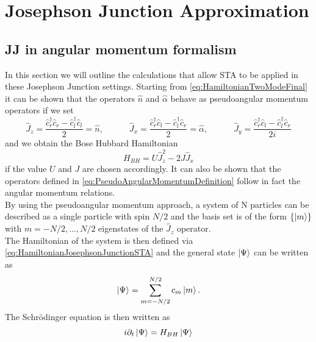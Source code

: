 \documentclass{article}
\begin{document}
\section{Josephson Junction Approximation}

\subsection{JJ in angular momentum formalism}
In this section we will outline the calculations that allow STA to be applied in these Josephson Junction settings.
Starting from \cref{eq:HamiltonianTwoModeFinal} it can be shown that the operators $ \hat{n} $ and $ \hat{ \alpha } $ behave as pseudoangular momentum operators if we set
\begin{equation}
	\label{eq:PseudoAngularMomentumDefinition}
	\hat{J}_z = \frac{\hat{c}_{r}^{\dagger}\hat{c}_{r} - \hat{c}_{l}^{\dagger}\hat{c}_{l}}{2} = \hat{n},\hspace{3em} \hat{J}_x =\frac{\hat{c}_{r}^{\dagger}\hat{c}_{l} - \hat{c}_{l}^{\dagger}\hat{c}_{r}}{2} =  \hat{ \alpha }  ,\hspace{3em}  \hat{J}_y = \frac{\hat{c}_{r}^{\dagger}\hat{c}_{l} - \hat{c}_{l}^{\dagger}\hat{c}_{r}}{2i}
\end{equation}
and we obtain the Bose Hubbard Hamiltonian
\begin{equation}
	\label{eq:HamiltonianJosephsonJunctionSTA}
	H_{BH} =  U \hat{J}_z^2 - 2J\hat{J}_x
\end{equation}
if the value $ U $ and $ J $ are chosen accordingly.
It can also be shown that the operators defined in \cref{eq:PseudoAngularMomentumDefinition} follow in fact the angular momentum relations.\\
By using the pseudoangular momentum approach, a system of N particles can be described as a single particle with spin $ N/2 $ and the basis set is of the form $ \{\ket{m}\} $ with $ m = -N/2, ..., N/2 $ eigenstates of the $ \hat{J}_{z} $ operator.\\
The Hamiltonian of the system is then defined via \cref{eq:HamiltonianJosephsonJunctionSTA} and the general state $ \ket{\Psi} $ can be written as
\begin{equation}
	\label{eq:GeneralStateAngularMomentum}
	\ket{\Psi} = \sum_{m = -N/2}^{N/2} c_{m}\ket{m}.
\end{equation}
The Schr{\"o}dinger equation is then written as
\begin{equation}
	\label{eq:SchrodingerEquationBoseHubbardAngular}
	i\partial_t \ket{\Psi} = H_{BH}\ket{\Psi}
\end{equation}
\end{document}
